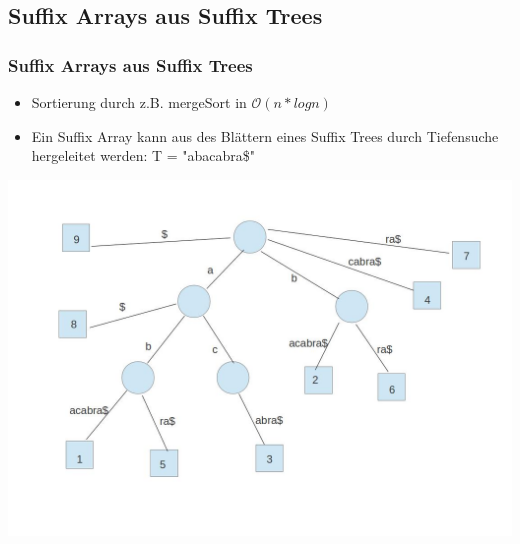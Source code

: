 \documentclass{beamer}
\begin{document}
\subsection{Suffix Arrays aus Suffix Trees}
\begin{frame}
\frametitle{Suffix Arrays aus Suffix Trees} %
\begin{itemize}
\item Sortierung durch z.B. mergeSort in ${ \scriptstyle \mathcal{O	}}(n*log n)$
\item Ein Suffix Array kann aus des Bl\"attern eines Suffix Trees durch Tiefensuche hergeleitet werden: T = "abacabra\$"\newline
\end{itemize}
\includegraphics[scale=0.2]{SuffixTree.jpg}
\end{frame}
\end{document}
